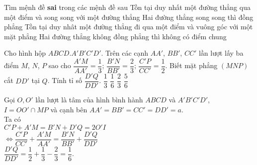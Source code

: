 \begin{ex}%
	Tìm mệnh đề \textbf{sai} trong các mệnh đề sau
	\choice
	{\True Tồn tại duy nhất một đường thẳng qua một điểm và song song với một đường thẳng}
	{Hai đường thẳng song song thì đồng phẳng}
	{Tồn tại duy nhât một đường thẳng đi qua một điểm và vuông góc với một mặt phẳng}
	{Hai đường thẳng không đồng phẳng thì không có điểm chung}
\end{ex}
\begin{ex}%
	Cho hình hộp $ABCD.A'B'C'D'$. Trên các cạnh $AA'$, $BB'$, $CC'$ lần lượt lấy ba điểm $M$, $N$, $P$ sao cho $\dfrac{A'M}{AA'}=\dfrac{1}{3}$; $\dfrac{B'N}{BB'}=\dfrac{2}{3}$; $\dfrac{C'P}{CC'}=\dfrac{1}{2}$. Biết mặt phẳng $(MNP)$ cắt $DD'$ tại $Q$. Tính tỉ số $\dfrac{D'Q}{DD'}$.
	\choice
	{$\dfrac{1}{3}$}
	{\True$\dfrac{1}{6}$}
	{$\dfrac{2}{3}$}
	{$\dfrac{5}{6}$}
	\loigiai
	{
		\immini
		{
			Gọi $O, O'$ lần lượt là tâm của hình bình hành $ABCD$ và $A'B'C'D'$, $I=OO'\cap MP$ và cạnh bên $AA' =BB'=CC'=DD' =a$.\\
			Ta có\\
			$C'P+A'M =B'N+D'Q =2 O'I$\\
			$\Leftrightarrow \dfrac{C'P}{CC'}+\dfrac{A'M}{AA'} =\dfrac{B'N}{BB'}+\dfrac{D'Q}{DD'}$\\
			$\dfrac{D'Q}{DD'} = \dfrac{1}{2}+\dfrac{1}{3}-\dfrac{2}{3}= \dfrac{1}{6}$.
		}
		{
		\begin{tikzpicture}[>=stealth,line join=round,line cap=round,font=\footnotesize,scale=1]
			

\end{tikzpicture}}}
\end{ex}
